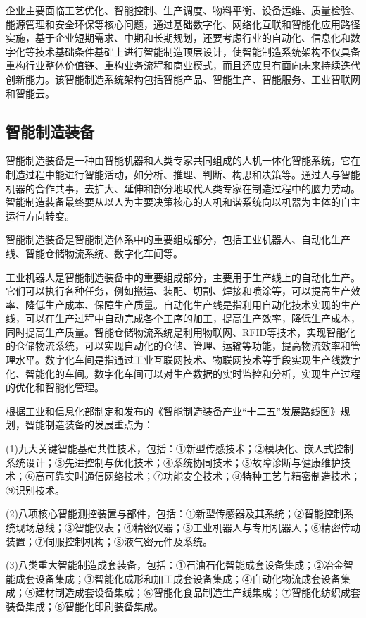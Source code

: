 \documentclass[lang=cn,12pt,bibtex,newtx,twoside,margintrue,citestyle=gb7714-2015, bibstyle=gb7714-2015]{elegantbook}
\begin{document}
企业主要面临工艺优化、智能控制、生产调度、物料平衡、设备运维、质量检验、能源管理和安全环保等核心问题，通过基础数字化、网络化互联和智能化应用路径实施，基于企业短期需求、中期和长期规划，还要考虑行业的自动化、信息化和数字化等技术基础条件基础上进行智能制造顶层设计，使智能制造系统架构不仅具备重构行业整体价值链、重构业务流程和商业模式，而且还应具有面向未来持续迭代创新能力\cite{柴春蕾2021}。该智能制造系统架构包括智能产品、智能生产、智能服务、工业智联网和智能云。


\subsection{智能制造装备}
\label{sec:org35308ca}
智能制造装备是一种由智能机器和人类专家共同组成的人机一体化智能系统，它在制造过程中能进行智能活动，如分析、推理、判断、构思和决策等\cite{傅建中2014}。通过人与智能机器的合作共事，去扩大、延伸和部分地取代人类专家在制造过程中的脑力劳动。智能制造装备最终要从以人为主要决策核心的人机和谐系统向以机器为主体的自主运行方向转变。

智能制造装备是智能制造体系中的重要组成部分，包括工业机器人、自动化生产线、智能仓储物流系统、数字化车间等。

工业机器人是智能制造装备中的重要组成部分，主要用于生产线上的自动化生产。它们可以执行各种任务，例如搬运、装配、切割、焊接和喷涂等，可以提高生产效率、降低生产成本、保障生产质量。自动化生产线是指利用自动化技术实现的生产线，可以在生产过程中自动完成各个工序的加工，提高生产效率，降低生产成本，同时提高生产质量。智能仓储物流系统是利用物联网、RFID等技术，实现智能化的仓储物流系统，可以实现自动化的仓储、管理、运输等功能，提高物流效率和管理水平。数字化车间是指通过工业互联网技术、物联网技术等手段实现生产线数字化、智能化的车间。数字化车间可以对生产数据的实时监控和分析，实现生产过程的优化和智能化管理。

根据工业和信息化部制定和发布的《智能制造装备产业“十二五”发展路线图》规划\cite{工业和信息化部2012}，智能制造装备的发展重点为：

(1)九大关键智能基础共性技术，包括：①新型传感技术；②模块化、嵌人式控制系统设计；③先进控制与优化技术；④系统协同技术；⑤故障诊断与健康维护技术；⑥高可靠实时通信网络技术；⑦功能安全技术；⑧特种工艺与精密制造技术；⑨识别技术。

(2)八项核心智能测控装置与部件，包括：①新型传感器及其系统；②智能控制系统现场总线；③智能仪表；④精密仪器；⑤工业机器人与专用机器人；⑥精密传动装置；⑦伺服控制机构；⑧液气密元件及系统。

(3)八类重大智能制造成套装备，包括：①石油石化智能成套设备集成；②冶金智能成套设备集成；③智能化成形和加工成套设备集成；④自动化物流成套设备集成；⑤建材制造成套设备集成；⑥智能化食品制造生产线集成；⑦智能化纺织成套装备集成；⑧智能化印刷装备集成。
\end{document}
